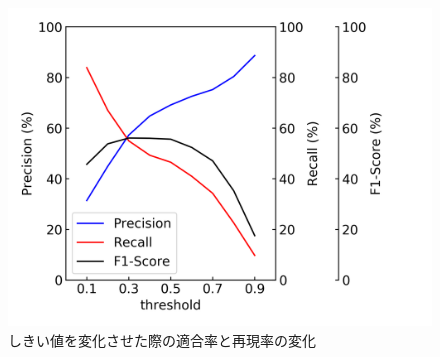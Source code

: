 \begin{figure}[htbp]
    \begin{center}
        \includegraphics[width=150mm]{./fig/resnet3dthreshold.png}
        \caption{しきい値を変化させた際の適合率と再現率の変化}
        \label{fig:resnet3d_result_threshold}
    \end{center}
\end{figure}
